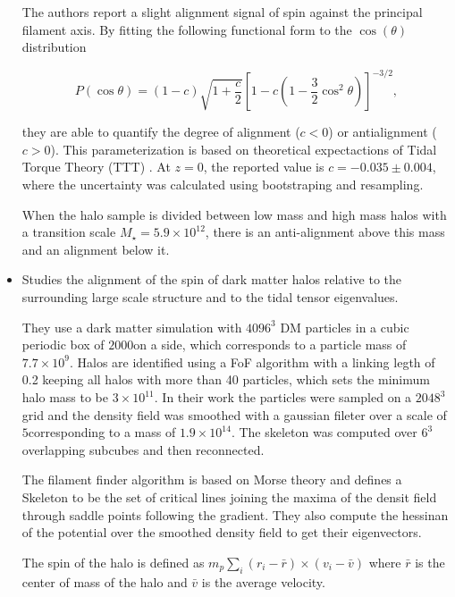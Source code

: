 \documentclass[useAMS,usenatbib]{mn2e}
\newcommand{\hMpc}{{\ifmmode{h^{-1}{\rm Mpc}}\else{$h^{-1}$Mpc }\fi}}
\newcommand{\Msun}{{\ifmmode{{\rm {M_{\odot}}}}\else{${\rm{M_{\odot}}}$}\fi}}
\begin{document}
\begin{itemize}
The authors report a slight alignment signal of spin against the
principal filament axis. By fitting the following functional form to
the $\cos(\theta)$ distribution

\begin{equation}
P(\cos\theta) =
(1-c)\sqrt{1+\frac{c}{2}}\left[1-c\left(1-\frac{3}{2}\cos^{2}\theta
  \right)\right]^{-3/2}, 
\label{eq:distro}
\end{equation}

they are able to quantify the degree of alignment ($c<0$) or
antialignment ($c>0$).  This parameterization is based on theoretical
expectactions of Tidal Torque Theory (TTT) \citep{Lee2005}. At $z=0$,
the reported value is $c = −0.035 \pm 0.004$, where the uncertainty
was calculated using bootstraping and resampling. 

When the halo sample is divided between low mass and high mass halos
with a transition scale $M_{\star}=5.9\times 10^{12}$\Msun, there is
an anti-alignment above this mass and an alignment below it. 


\item 
\citep{Codis2012}
Studies the alignment of the spin of dark matter halos relative to
the surrounding large scale structure and to the tidal tensor
eigenvalues.

They use a dark matter simulation with $4096^3$ DM particles in a
cubic periodic box of $2000$\hMpc on a side, which corresponds to a
particle mass of $7.7\times 10^9$\Msun. Halos are identified
using a FoF algorithm with a linking legth of 0.2 keeping all halos
with more than 40 particles, which sets the minimum halo mass to be
$3\times 10^{11}$\Msun. In their work the particles were sampled on a
$2048^3$ grid and the density field was smoothed with a gaussian
fileter over a scale of $5$\hMpc corresponding to a mass of $1.9\times
10^{14}$. The skeleton was computed over $6^{3}$ overlapping subcubes
and then reconnected.



The filament finder algorithm is based on Morse theory and defines a
Skeleton to be the set of critical lines joining the maxima of the
densit field through saddle points following the gradient. They also
compute the hessinan of the potential over the smoothed density field
to get their eigenvectors.


The spin of the halo is defined as $m_{p}\sum_{i}(r_i-\bar{r})\times
(v_i-\bar{v})$ where $\bar{r}$ is the center of mass of the halo and
$\bar{v}$ is the average velocity.


\end{itemize}
\end{document}
